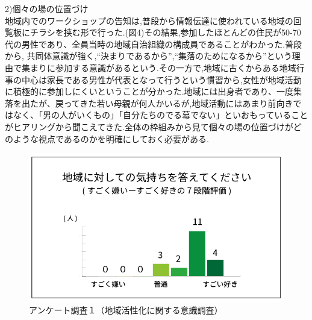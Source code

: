 \documentclass[a4paper]{jsarticle}
\begin{document}
\item 2)個々の場の位置づけ\\
地域内でのワークショップの告知は,普段から情報伝達に使われている地域の回覧板にチラシを挟む形で行った.(図4)その結果,参加したほとんどの住民が50-70代の男性であり、全員当時の地域自治組織の構成員であることがわかった.普段から, 共同体意識が強く,“決まりであるから”,“集落のためになるから”という理由で集まりに参加する意識があるという.その一方で,地域に古くからある地域行事の中心は家長である男性が代表となって行うという慣習から,女性が地域活動に積極的に参加しにくいということが分かった.地域には出身者であり、一度集落を出たが、戻ってきた若い母親が何人かいるが,地域活動にはあまり前向きではなく、「男の人がいくもの」「自分たちのでる幕でない」といおもっていることがヒアリングから聞こえてきた.全体の枠組みから見て個々の場の位置づけがどのような視点であるのかを明確にしておく必要がある.\\
\begin{figure}[h]
  \begin{center}
    \includegraphics[width=0.95\hsize]{./images/03}
    \caption{アンケート調査１（地域活性化に関する意識調査）}
    \label{fig:tmu_hino}
  \end{center}
\end{figure}
\end{document}
